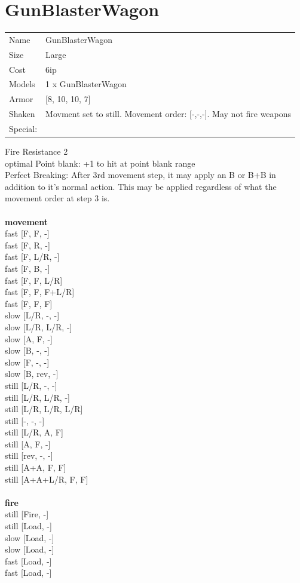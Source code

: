\clearpage

\section{ GunBlasterWagon }

\begin{tabular}{ll}
  Name & GunBlasterWagon \\
  Size & Large\\
  Cost & 6ip\\
  Models & 1 x GunBlasterWagon\\
  Armor & [8, 10, 10, 7]\\
  Shaken & Movment set to still. Movement order: [-,-,-]. May not fire weapons\\
  Special: \\
\end{tabular}

\noindent Fire Resistance 2\\ 
optimal Point blank: +1 to hit at point blank range\\ 
Perfect Breaking: After 3rd movement step, it may apply an B or B+B in addition to it's normal action. This may be applied regardless of what the movement order at step 3 is.\\ 


\ \\ {\bf movement } \\
fast [F, F, -] \\
fast [F, R, -] \\
fast [F, L/R, -] \\
fast [F, B, -] \\
fast [F, F, L/R] \\
fast [F, F, F+L/R] \\
fast [F, F, F] \\
slow [L/R, -, -] \\
slow [L/R, L/R, -] \\
slow [A, F, -] \\
slow [B, -, -] \\
slow [F, -, -] \\
slow [B, rev, -] \\
still [L/R, -, -] \\
still [L/R, L/R, -] \\
still [L/R, L/R, L/R] \\
still [-, -, -] \\
still [L/R, A, F] \\
still [A, F, -] \\
still [rev, -, -] \\
still [A+A, F, F] \\
still [A+A+L/R, F, F] \\
\ \\ {\bf fire } \\
still [Fire, -] \\
still [Load, -] \\
slow [Load, -] \\
slow [Load, -] \\
fast [Load, -] \\
fast [Load, -] \\


